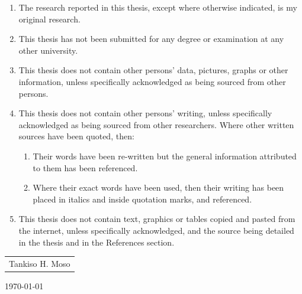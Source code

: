 \documentclass[12pt,a4paper]{report}
\begin{document}
\begin{enumerate}
	\item The research reported in this thesis, except where otherwise indicated, is my original research.
	\item This thesis has not been submitted for any degree or examination at any other university.
	\item This thesis does not contain other persons’ data, pictures, graphs or other information, unless specifically acknowledged as being sourced from other persons.
	\item This thesis does not contain other persons' writing, unless specifically acknowledged as being sourced from other researchers.  Where other written sources have been quoted, then:
\begin{enumerate}
	\item Their words have been re-written but the general information attributed to them has been referenced.
	\item Where their exact words have been used, then their writing has been placed in italics and inside quotation marks, and referenced.
\end{enumerate}
		
	\item This thesis does not contain text, graphics or tables copied and pasted from the internet, unless specifically acknowledged, and the source being detailed in the thesis and in the References section.
\end{enumerate}
\vspace{0.5cm}
	
\begin{table}[h]
\begin{tabular}{c}
\hline
Tankiso H. Moso\\
\end{tabular}
\end{table}	
{\large \today}\\ %

\newpage
{}


\newpage
{}


\newpage
{}


\newpage
\renewcommand\contentsname{Table of Contents} %
\tableofcontents\newpage %

	








   
{}
    
\end{document}
